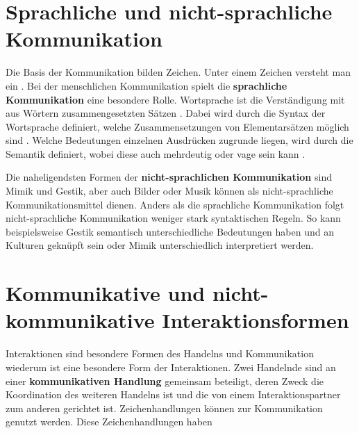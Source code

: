 \section{Sprachliche und nicht-sprachliche Kommunikation}
\label{sec:02-01_verbal-and-nonverbal-communication}

Die Basis der Kommunikation bilden Zeichen. Unter einem Zeichen versteht man ein . \cite[S. 10]{000_MKO01_communication-and-semiotics} Bei der menschlichen Kommunikation spielt die \textbf{sprachliche Kommunikation} eine besondere Rolle. Wortsprache ist die Verständigung mit aus Wörtern zusammengesetzten Sätzen \cite[S. 16]{000_MKO01_communication-and-semiotics}. Dabei wird durch die Syntax der Wortsprache definiert, welche Zusammensetzungen von Elementarsätzen möglich sind \cite[S. 17 f.]{000_MKO01_communication-and-semiotics}. Welche Bedeutungen einzelnen Ausdrücken zugrunde liegen, wird durch die Semantik definiert, wobei diese auch mehrdeutig oder vage sein kann \cite[S. 21]{000_MKO01_communication-and-semiotics}.

Die naheligendsten Formen der \textbf{nicht-sprachlichen Kommunikation} sind Mimik und Gestik, aber auch Bilder oder Musik können als nicht-sprachliche Kommunikationsmittel dienen. Anders als die sprachliche Kommunikation folgt nicht-sprachliche Kommunikation weniger stark syntaktischen Regeln. So kann beispielsweise Gestik semantisch unterschiedliche Bedeutungen haben und an Kulturen geknüpft sein oder Mimik unterschiedlich interpretiert werden. \cite[S. 31 f.]{000_MKO01_communication-and-semiotics}

\section{Kommunikative und nicht-kommunikative Interaktionsformen}
\label{sec:02-02_communicative-and-non-communicative-interaction}

Interaktionen sind besondere Formen des Handelns und Kommunikation wiederum ist eine besondere Form der Interaktionen. Zwei Handelnde sind an einer \textbf{kommunikativen Handlung} gemeinsam beteiligt, deren Zweck die Koordination des weiteren Handelns ist und die von einem Interaktionspartner zum anderen gerichtet ist. Zeichenhandlungen können zur Kommunikation genutzt werden. \cite[S. 33]{001_MKO02_media-as-means-of-communication} Diese Zeichenhandlungen haben


